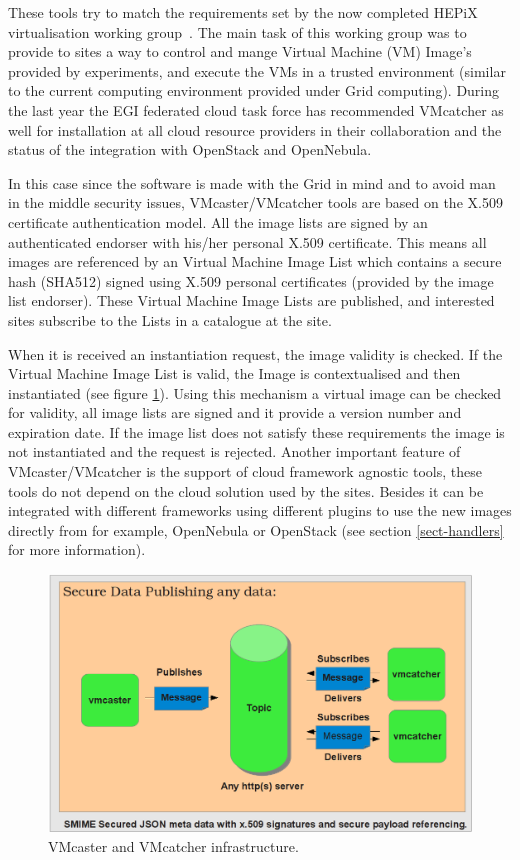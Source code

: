\documentclass{llncs_Ibergrid2013}
\begin{document}
These tools try to match the requirements set by the now completed HEPiX virtualisation working group~\cite{hepix}.
The main task of this working group was to provide to sites a way to control and mange Virtual Machine (VM) Image's provided by experiments, and execute the VMs in a trusted environment (similar to the current computing environment provided under Grid computing).
During the last year the EGI federated cloud task force has recommended VMcatcher as well for installation at all cloud resource providers in their collaboration and the status of the integration with OpenStack and OpenNebula.

In this case since the software is made with the Grid in mind and to avoid man in the middle security issues, VMcaster/VMcatcher tools are based on the X.509 certificate authentication model.
All the image lists are signed by an authenticated endorser with his/her personal X.509 certificate. 
This means all images are referenced by an Virtual Machine Image List which contains a secure hash (SHA512) signed using X.509 personal certificates (provided by the image list endorser). 
These Virtual Machine Image Lists are published, and interested sites subscribe to the Lists in a catalogue at the site. 

When it is received an instantiation request, the image validity is checked. If the Virtual Machine Image List is valid, the Image is contextualised and then instantiated (see figure \ref{fig:infrastructure}). 
Using this mechanism a virtual image can be checked for validity, all image lists are signed and it provide a version number and expiration date. If the image list does not satisfy these requirements the image is not instantiated and the request is rejected.
Another important feature of VMcaster/VMcatcher is the support of cloud framework agnostic tools, these tools do not depend on the cloud solution used by the sites. Besides it can be integrated with different frameworks using different plugins to use the new images directly from for example, OpenNebula or OpenStack (see section \ref{sect-handlers} for more information).

\begin{figure}[h]
\centering
\includegraphics[width=1\textwidth]{vmcaster_vmcatcher.png}
\caption{VMcaster and VMcatcher infrastructure.}
\label{fig:infrastructure}
\end{figure}
\end{document}
